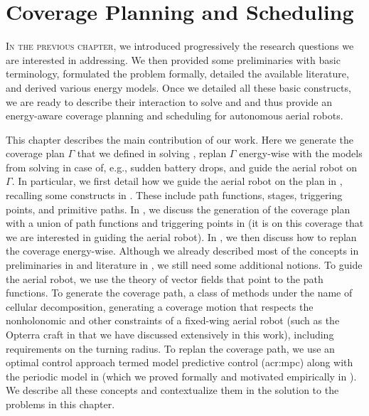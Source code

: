 
\chapter{Coverage Planning and Scheduling}
\label{cp:dyn}

\lettrine{I}{n the previous chapter}, we introduced progressively the research questions we are interested in addressing. We then provided some preliminaries with basic terminology, formulated the problem formally, detailed the available literature, and derived various energy models. Once we detailed all these basic constructs, we are ready to describe their interaction to solve  and  and thus provide an energy-aware coverage planning and scheduling for autonomous aerial robots.

This chapter describes the main contribution of our work. Here we generate the coverage plan $\Gamma$ that we defined in  solving , replan $\Gamma$ energy-wise with the models from  solving  in case of, e.g., sudden battery drops, and guide the aerial robot on $\Gamma$. In particular, we first detail how we guide the aerial robot on the plan in , recalling some constructs in . These include path functions, stages, triggering points, and primitive paths. In , we discuss the generation of the coverage plan with a union of path functions and triggering points in  (it is on this coverage that we are interested in guiding the aerial robot). In , we then discuss how to replan the coverage energy-wise. Although we already described most of the concepts in preliminaries in  and literature in , we still need some additional notions. To guide the aerial robot, we use the theory of vector fields that point to the path functions. To generate the coverage path, a class of methods under the name of cellular decomposition, generating a coverage motion that respects the nonholonomic and other constraints of a fixed-wing aerial robot (such as the Opterra craft in  that we have discussed extensively in this work), including requirements on the turning radius. To replan the coverage path, we use an optimal control approach termed model predictive control (\Gls{acr:mpc}) along with the periodic model in  (which we proved formally and motivated empirically in ). We describe all these concepts and contextualize them in the solution to the problems in this chapter. 

